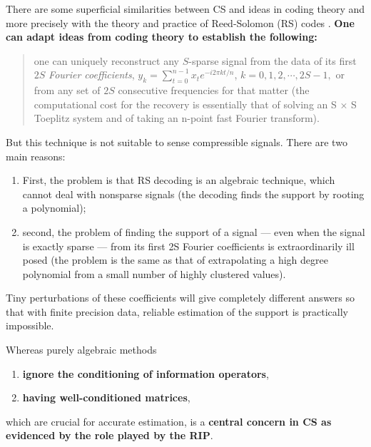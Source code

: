 There are some superficial similarities between CS and ideas in coding theory and more precisely with the theory and practice of Reed-Solomon (RS) codes \cite{26}. \textbf{One can adapt ideas from coding theory to establish the following:}
\begin{quote}
	one can uniquely reconstruct any $S$-sparse signal from the data of its first $2S$ \emph{Fourier coefficients}, $y_k=\sum_{t=0}^{n-1}x_te^{-i2\pi kt/n}$, $k=0,1,2,\cdots,2S-1,$ or from any set of $2S$ consecutive frequencies for that matter (the computational cost for the recovery is essentially that of solving an S × S Toeplitz system
	and of taking an n-point fast Fourier transform).
\end{quote}

But this technique is not suitable to sense compressible signals. There are two main reasons:
\begin{enumerate}
	\item First, the problem is that RS decoding is an algebraic technique, which cannot deal with nonsparse signals (the decoding finds the support by rooting a polynomial);
	\item second, the problem of finding the support of a signal --- even when the signal is exactly sparse --- from its first 2S Fourier coefficients is extraordinarily ill posed (the problem is the same as that of extrapolating a high degree polynomial from a small number of highly clustered values). 
\end{enumerate}
Tiny perturbations of these coefficients will give completely different answers so that with finite precision data, reliable estimation of the support is practically impossible.

Whereas purely algebraic methods 
\begin{enumerate}
	\item \textbf{ignore the conditioning of information operators},
	\item \textbf{having well-conditioned matrices}, 
\end{enumerate} 
which are crucial for accurate estimation, is a \textbf{\textcolor[rgb]{1,0,0}{central concern in CS as evidenced by the role played by the RIP}}.
